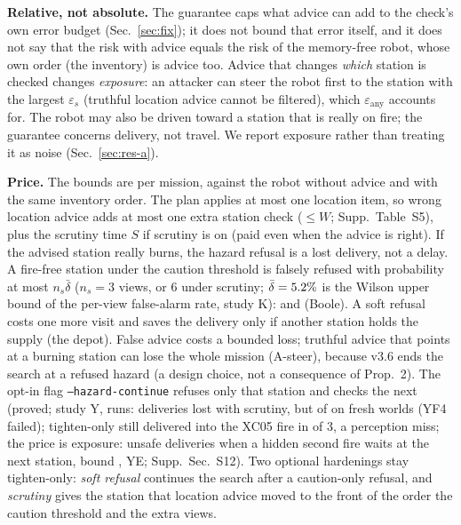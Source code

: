 \documentclass[conference]{IEEEtran}
\begin{document}
\textbf{Relative, not absolute.} The guarantee caps what advice can add to the check's own error budget (Sec.~\ref{sec:fix}); it does not bound that error itself, and it does not say that the risk with advice equals the risk of the memory-free robot, whose own order (the inventory) is advice too. Advice that changes \emph{which} station is checked changes \emph{exposure}: an attacker can steer the robot first to the station with the largest $\varepsilon_s$ (truthful location advice cannot be filtered), which $\varepsilon_{\mathrm{any}}$ accounts for. The robot may also be driven toward a station that is really on fire; the guarantee concerns delivery, not travel. We report exposure rather than treating it as noise (Sec.~\ref{sec:res-a}).

\textbf{Price.} The bounds are per mission, against the robot without advice and with the same inventory order. The plan applies at most one location item, so wrong location advice adds at most one extra station check ($\le W$; Supp.~Table~S5), plus the scrutiny time $S$ if scrutiny is on (paid even when the advice is right). If the advised station really burns, the hazard refusal is a lost delivery, not a delay. A fire-free station under the caution threshold is falsely refused with probability at most $n_s\bar\delta$ ($n_s=3$ views, or 6 under scrutiny; $\bar\delta=5.2\%$ is the Wilson upper bound of the per-view false-alarm rate, study K): \KCautThreeBoole{} and \KCautSixBoole{} (Boole). A soft refusal costs one more visit and saves the delivery only if another station holds the supply (the depot). False advice costs a bounded loss; truthful advice that points at a burning station can lose the whole mission (A-steer), because v3.6 ends the search at a refused hazard (a design choice, not a consequence of Prop.~2). The opt-in flag \texttt{--hazard-continue} refuses only that station and checks the next (proved; study Y, \YN{} runs: \YSLostScr{} deliveries lost with scrutiny, but \YFLostScr{} of \YFPairs{} on fresh worlds (YF4 failed); tighten-only still delivered into the XC05 fire in \YMonoMiss{} of 3, a perception miss; the price is exposure: \YEUnsafeHc{} unsafe deliveries when a hidden second fire waits at the next station, bound \YEUnsafeHcUpper, YE; Supp.~Sec.~S12). Two optional hardenings stay tighten-only: \emph{soft refusal} continues the search after a caution-only refusal, and \emph{scrutiny} gives the station that location advice moved to the front of the order the caution threshold and the extra views.
\end{document}
